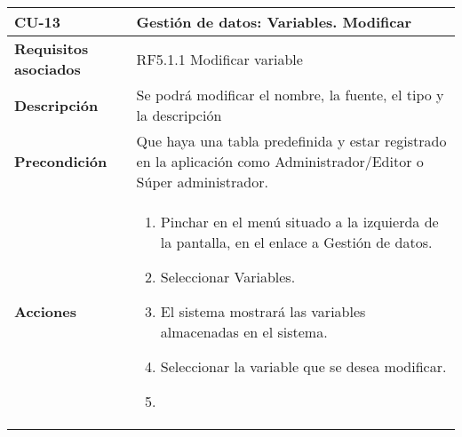 \newpage
\begin{longtable}[H]{@{}ll@{}}
\toprule
\begin{minipage}[b]{0.23\columnwidth}\raggedright\strut
\textbf{CU-13}\strut
\end{minipage} & \begin{minipage}[b]{0.71\columnwidth}\raggedright\strut
\textbf{Gestión de datos: Variables. Modificar}\strut
\end{minipage}\tabularnewline
\midrule
\endhead
\begin{minipage}[t]{0.23\columnwidth}\raggedright\strut
\textbf{Requisitos asociados}\strut
\end{minipage} & \begin{minipage}[t]{0.71\columnwidth}\raggedright\strut
RF5.1.1 Modificar variable\strut
\end{minipage}\tabularnewline
\begin{minipage}[t]{0.23\columnwidth}\raggedright\strut
\textbf{Descripción}\strut
\end{minipage} & \begin{minipage}[t]{0.71\columnwidth}\raggedright\strut
Se podrá modificar el nombre, la fuente, el tipo y la descripción
\strut
\end{minipage}\tabularnewline
\begin{minipage}[t]{0.23\columnwidth}\raggedright\strut
\textbf{Precondición}\strut
\end{minipage} & \begin{minipage}[t]{0.71\columnwidth}\raggedright\strut
Que haya una tabla predefinida y estar registrado en la aplicación como Administrador/Editor o Súper administrador.\strut
\end{minipage}\tabularnewline
\begin{minipage}[t]{0.23\columnwidth}\raggedright\strut
\textbf{Acciones}\strut
\end{minipage} & \begin{minipage}[t]{0.71\columnwidth}\raggedright\strut
\begin{enumerate}
\def\labelenumi{\arabic{enumi}.}
\tightlist
\item
Pinchar en el menú situado a la izquierda de la pantalla, en el
enlace a Gestión de datos.
\item
Seleccionar Variables.
\item
El sistema mostrará las variables almacenadas en el sistema.
\item
Seleccionar la variable que se desea modificar.
\item

\end{enumerate}
\end{minipage}
\end{longtable}
